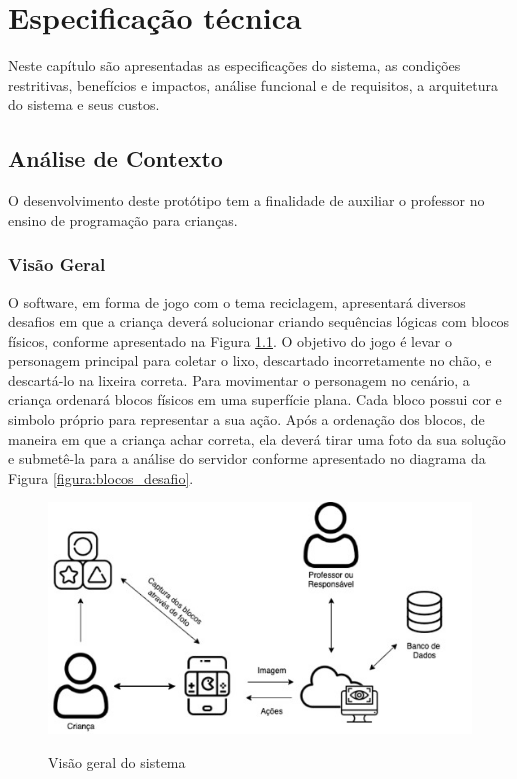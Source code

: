 \chapter{Especificação técnica} \label{cap:especificacao_tecnica}
Neste capítulo são apresentadas as especificações do sistema, as condições restritivas, benefícios e impactos, análise funcional e de requisitos, a arquitetura do sistema e seus custos.

\section{Análise de Contexto}

    O desenvolvimento deste protótipo tem a finalidade de auxiliar o professor no ensino de programação para crianças.
    
    \subsection{Visão Geral}
    
    O software, em forma de jogo com o tema reciclagem, apresentará diversos desafios em que a criança deverá solucionar criando sequências lógicas com blocos físicos, conforme apresentado na Figura \ref{figura:visao_geral}. O objetivo do jogo é levar o personagem principal para coletar o lixo, descartado incorretamente no chão, e descartá-lo na lixeira correta. Para movimentar o personagem no cenário, a criança ordenará blocos físicos em uma superfície plana. Cada bloco possui cor e simbolo próprio para representar a sua ação. Após a ordenação dos blocos, de maneira em que a criança achar correta, ela deverá tirar uma foto da sua solução e submetê-la para a análise do servidor conforme apresentado no diagrama da Figura \ref{figura:blocos_desafio}.
    
    \begin{figure}[H]
        \caption{Visão geral do sistema}
        \centering
        \includegraphics[width=\linewidth]{Imagens/Cap3/Visao_Geral.jpg}
        \label{figura:visao_geral}
    \end{figure}
    
